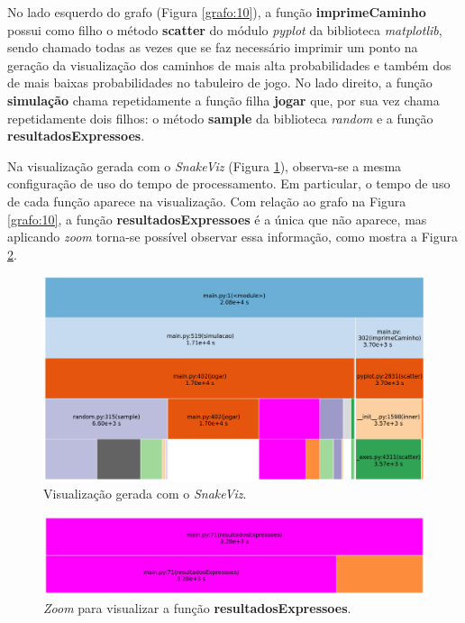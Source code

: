 \documentclass[12pt]{article}
\begin{document}
No lado esquerdo do grafo (Figura \ref{grafo:10}), a função \textbf{imprimeCaminho} possui como filho o método \textbf{scatter} do módulo \textit{pyplot} da biblioteca \textit{matplotlib}, sendo chamado todas as vezes que se faz necessário imprimir um ponto na geração da visualização dos caminhos de mais alta probabilidades e também dos de mais baixas probabilidades no tabuleiro de jogo. No lado direito, a função \textbf{simulação} chama repetidamente a função filha \textbf{jogar} que, por sua vez chama repetidamente dois filhos: o método \textbf{sample} da biblioteca \textit{random} e a função \textbf{resultadosExpressoes}.

Na visualização gerada com o \textit{SnakeViz} (Figura \ref{viewSnakeViz}), observa-se a mesma configuração de uso do tempo de processamento. Em particular, o tempo de uso de cada função aparece na visualização. Com relação ao grafo na Figura \ref{grafo:10}, a função \textbf{resultadosExpressoes} é a única que não aparece, mas aplicando \textit{zoom} torna-se possível observar essa informação, como mostra a Figura \ref{viewSnakeVizZoom}.

\begin{figure}[ht]
	\centering
	\includegraphics[width=0.9\linewidth]{img/view_snakeviz_1.png}
	\caption{Visualização gerada com o \textit{SnakeViz}.}
	\label{viewSnakeViz}
\end{figure}

\begin{figure}[ht]
	\centering
	\includegraphics[width=0.9\linewidth]{img/viewSnakeVizZoom.png}
	\caption{\textit{Zoom} para visualizar a função \textbf{resultadosExpressoes}.}
	\label{viewSnakeVizZoom}
\end{figure}
\end{document}
